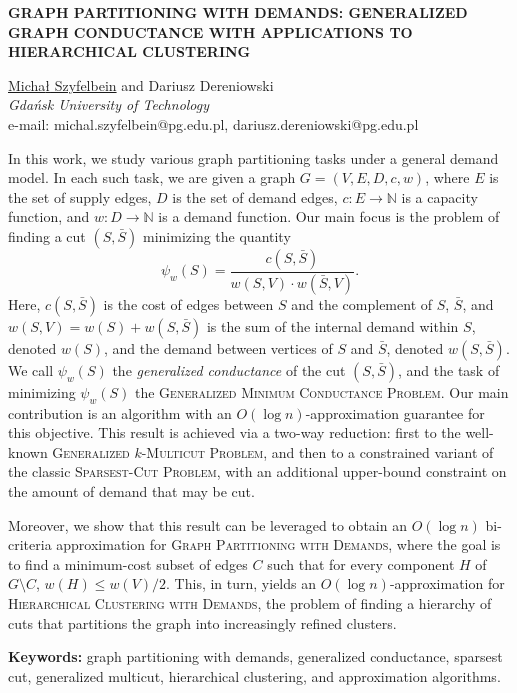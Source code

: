 \documentclass[11pt]{article}
\newcommand{\Title}[1]{{\large\bf \uppercase{#1}}}
\newcommand{\Email}[1]{\\
	\smallskip \small{e-mail:} \textnormal{#1}}
\newcommand{\Author}[2]{{\sc #1} \\
	\medskip
	{\small\textit{#2}}}
\renewenvironment{abstract}{}{}
\begin{document}
\begin{center}
\Title{Graph Partitioning with Demands: Generalized Graph Conductance With Applications to Hierarchical Clustering}

\bigskip
\Author{\underline{Micha{\l} Szyfelbein} and Dariusz Dereniowski}
{Gda\'nsk University of Technology}
\Email{michal.szyfelbein@pg.edu.pl, dariusz.dereniowski@pg.edu.pl}
\end{center}

\medskip

\begin{abstract}
  In this work, we study various graph partitioning tasks under a general demand model. In each such task, we are given a graph $G=(V,E,D,c,w)$, where $E$ is the set of supply edges, $D$ is the set of demand edges, $c\colon E\to \mathbb{N}$ is a capacity function, and $w\colon D\to \mathbb{N}$ is a demand function. Our main focus is the problem of finding a cut $(S, \bar{S})$ minimizing the quantity
  \[
  \psi_w(S) = \frac{c(S, \bar{S})}{w(S, V)\cdot w(\bar{S}, V)}.
  \]
  Here, $c(S, \bar{S})$ is the cost of edges between $S$ and the complement of $S$, $\bar{S}$, and $w(S, V)=w(S)+w(S, \bar{S})$ is the sum of the internal demand within $S$, denoted $w(S)$, and the demand between vertices of $S$ and $\bar{S}$, denoted $w(S, \bar{S})$. We call $\psi_w(S)$ the \emph{generalized conductance} of the cut $(S, \bar{S})$, and the task of minimizing $\psi_w(S)$ the \textsc{Generalized Minimum Conductance Problem}. Our main contribution is an algorithm with an $O(\log n)$-approximation guarantee for this objective. This result is achieved via a two-way reduction: first to the well-known \textsc{Generalized $k$-Multicut Problem}, and then to a constrained variant of the classic \textsc{Sparsest-Cut Problem}, with an additional upper-bound constraint on the amount of demand that may be cut.
  
  Moreover, we show that this result can be leveraged to obtain an $O(\log n)$ bi-criteria approximation for \textsc{Graph Partitioning with Demands}, where the goal is to find a minimum-cost subset of edges $C$ such that for every component $H$ of $G\setminus C$, $w(H)\leq w(V)/2$. This, in turn, yields an $O(\log n)$-approximation for \textsc{Hierarchical Clustering with Demands}, the problem of finding a hierarchy of cuts that partitions the graph into increasingly refined clusters.
\end{abstract}

\noindent\textbf{Keywords:} graph partitioning with demands, generalized conductance, sparsest cut, generalized multicut, hierarchical clustering, and approximation algorithms.


\medskip

\nocite{*}


\end{document}
